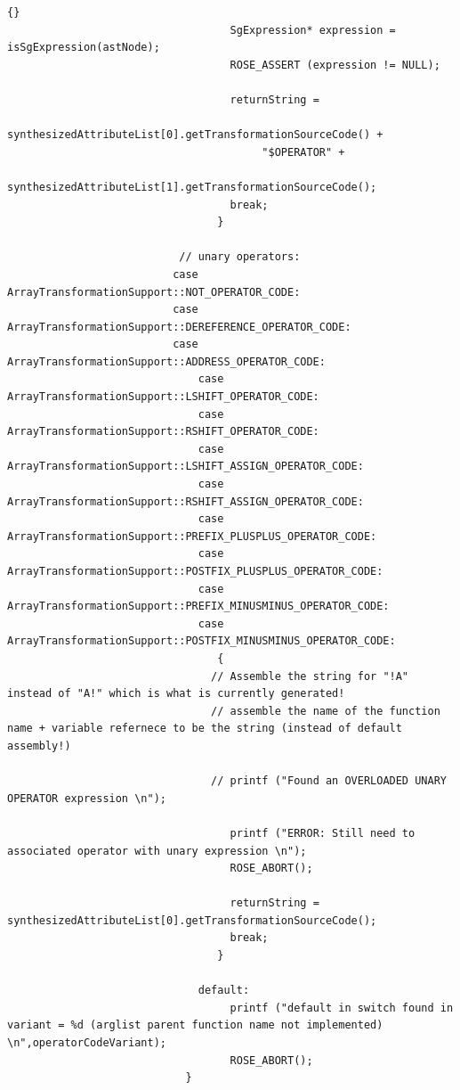\documentclass[10pt]{article}
\begin{document}
{\begin{lstlisting}{}
                                   SgExpression* expression = isSgExpression(astNode);
                                   ROSE_ASSERT (expression != NULL);

                                   returnString =
                                        synthesizedAttributeList[0].getTransformationSourceCode() +
                                        "$OPERATOR" +
                                        synthesizedAttributeList[1].getTransformationSourceCode();
                                   break;
                                 }

                           // unary operators:
	                      case ArrayTransformationSupport::NOT_OPERATOR_CODE:
	                      case ArrayTransformationSupport::DEREFERENCE_OPERATOR_CODE:
	                      case ArrayTransformationSupport::ADDRESS_OPERATOR_CODE:
                              case ArrayTransformationSupport::LSHIFT_OPERATOR_CODE:
                              case ArrayTransformationSupport::RSHIFT_OPERATOR_CODE:
                              case ArrayTransformationSupport::LSHIFT_ASSIGN_OPERATOR_CODE:
                              case ArrayTransformationSupport::RSHIFT_ASSIGN_OPERATOR_CODE:
                              case ArrayTransformationSupport::PREFIX_PLUSPLUS_OPERATOR_CODE:
                              case ArrayTransformationSupport::POSTFIX_PLUSPLUS_OPERATOR_CODE:
                              case ArrayTransformationSupport::PREFIX_MINUSMINUS_OPERATOR_CODE:
                              case ArrayTransformationSupport::POSTFIX_MINUSMINUS_OPERATOR_CODE:
                                 {
                                // Assemble the string for "!A" instead of "A!" which is what is currently generated!
                                // assemble the name of the function name + variable refernece to be the string (instead of default assembly!) 

                                // printf ("Found an OVERLOADED UNARY OPERATOR expression \n");

                                   printf ("ERROR: Still need to associated operator with unary expression \n");
                                   ROSE_ABORT();

                                   returnString = synthesizedAttributeList[0].getTransformationSourceCode();
                                   break;
                                 }

                              default:
                                   printf ("default in switch found in variant = %d (arglist parent function name not implemented) \n",operatorCodeVariant);
                                   ROSE_ABORT();
                            }


\end{lstlisting}}
\end{document}
